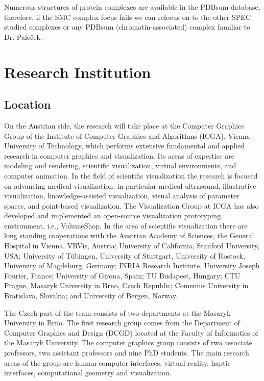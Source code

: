 \documentclass[11pt,a4paper,titlepage,oneside,onecolumn]{article}
\begin{document}
Numerous structures of protein complexes are available in the PDBsum database, therefore, if the SMC complex focus fails we can refocus on to the other SPEC studied complexes or any PDBsum (chromatin-associated) complex familiar to Dr. Pale\v{c}ek. 
\section{Research Institution}
\label{sec:ResearchInstitution}

\subsection{Location}
On the Austrian side, the research will take place at the Computer Graphics Group of the Institute of Computer Graphics and Algorithms (ICGA), Vienna University of Technology, which performs extensive fundamental and applied research in computer graphics and visualization. 
Its areas of expertise are modeling and rendering, scientific visualization, virtual environments, and computer animation. In the field of scientific visualization the research is focused on advancing medical visualization, in particular medical ultrasound, illustrative visualization, knowledge-assisted visualization, visual analysis of parameter spaces, and point-based visualization. The Visualization Group at ICGA has also developed and implemented an open-source visualization prototyping environment, i.e., VolumeShop. In the area of scientific visualization there are long standing cooperations with the Austrian Academy of Sciences, the General Hospital in Vienna, VRVis, Austria; University of California, Stanford University, USA; University of T\"{u}bingen, University of Stuttgart, University of Rostock, University of Magdeburg, Germany; INRIA Research Institute, University Joseph Fourier, France;  University of Girona, Spain; TU Budapest, Hungary; CTU Prague, Masaryk University in Brno, Czech Republic; Comenius University in Bratislava, Slovakia; and University of Bergen, Norway.

The Czech part of the team consists of two departments at the Masaryk University in Brno.
The first research group comes from the Department of Computer Graphics and Design (DCGD) located at the Faculty of Informatics of the Masaryk University. 
The computer graphics group consists of two associate professors, two assistant professors and nine PhD students. 
The main research areas of the group are human-computer interfaces, virtual reality, haptic interfaces, computational geometry and visualization. 
\end{document}
